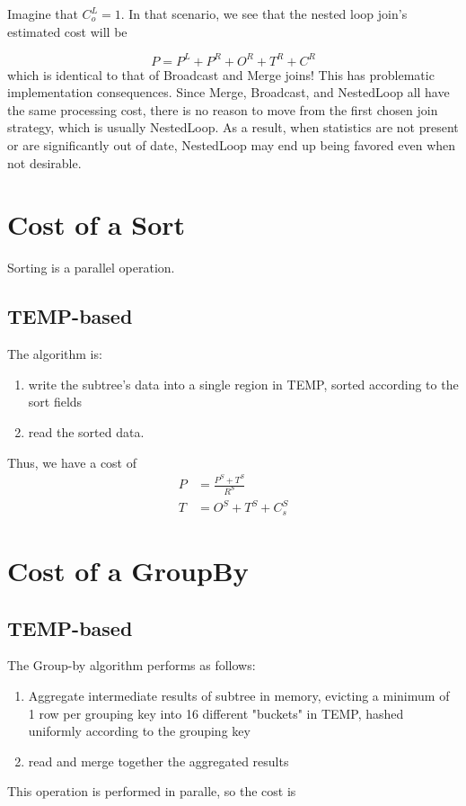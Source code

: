 \documentclass[10pt]{amsart}
\begin{document}
Imagine that $C_o^L = 1$. In that scenario, we see that the nested loop join's estimated cost will be

\begin{equation*}
	P = P^L + P^R + O^R + T^R + C^R
\end{equation*}
which is identical to that of Broadcast and Merge joins! This has problematic implementation consequences. Since Merge, Broadcast, and NestedLoop all have the same processing cost, there is no reason to move from the first chosen join strategy, which is usually NestedLoop. As a result, when statistics are not present or are significantly out of date, NestedLoop may end up being favored even when not desirable.


\section{Cost of a Sort}
Sorting is a parallel operation.
\subsection{TEMP-based}
The algorithm is:

\begin{enumerate}
				\item write the subtree's data into a single region in TEMP, sorted according to the sort fields
				\item read the sorted data.
\end{enumerate}

Thus, we have a cost of 
\begin{equation}
				\begin{aligned}
								P &= \frac{P^S +T^S}{R^S} \\
					T &= O^S + T^S + C_s^S
				\end{aligned}
\end{equation}

\section{Cost of a GroupBy}
\subsection{TEMP-based}
The Group-by algorithm performs as follows:
\begin{enumerate}
				\item Aggregate intermediate results of subtree in memory, evicting a minimum of 1 row per grouping key into 16 different "buckets" in TEMP, hashed uniformly according to the grouping key
				\item read and merge together the aggregated results
\end{enumerate}
This operation is performed in paralle, so the cost is
\end{document}
